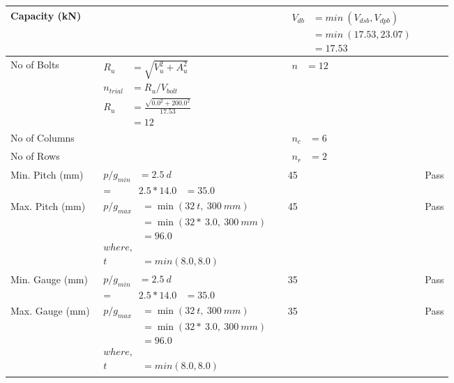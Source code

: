\documentclass{article}%
\begin{document}
\begin{longtable}{|p{2.5cm}|p{5.5cm}|p{7cm}|p{1cm}|}
\hline%
Capacity (kN)&&$\begin{aligned}V_{db} &= min~ (V_{dsb}, V_{dpb})\\ &= min~ (17.53,23.07)\\ &=17.53\end{aligned}$&\\%
\hline%
No of Bolts&$\begin{aligned}R_{u} &= \sqrt{V_u^2+A_u^2}\\ n_{trial} &= R_u/ V_{bolt}\\ R_{u} &= \frac{\sqrt{0.0^2+200.0^2}}{17.53}\\ &=12\end{aligned}$&$\begin{aligned} n &=12\end{aligned}$&\\%
\hline%
No of Columns&&$\begin{aligned} n_c &=6\end{aligned}$&\\%
\hline%
No of Rows&&$\begin{aligned} n_r &=2\end{aligned}$&\\%
\hline%
Min. Pitch (mm)&$\begin{aligned}p/g_{min}&= 2.5 ~ d&\\ =&2.5*14.0&=35.0\end{aligned}$&45&Pass\\%
\hline%
Max. Pitch (mm)&$\begin{aligned}p/g_{max} &=\min(32~t,~300~mm)&\\ &=\min(32 *~3.0,~ 300 ~mm)\\&=96.0\\ where,&\\  t &= min(8.0,8.0)\end{aligned}$&45&Pass\\%
\hline%
Min. Gauge (mm)&$\begin{aligned}p/g_{min}&= 2.5 ~ d&\\ =&2.5*14.0&=35.0\end{aligned}$&35&Pass\\%
\hline%
Max. Gauge (mm)&$\begin{aligned}p/g_{max} &=\min(32~t,~300~mm)&\\ &=\min(32 *~3.0,~ 300 ~mm)\\&=96.0\\ where,&\\  t &= min(8.0,8.0)\end{aligned}$&35&Pass\\%

\end{longtable}
\end{document}
